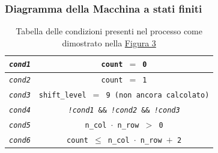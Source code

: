 \documentclass{article}
\begin{document}
\subsubsection{Diagramma della Macchina a stati finiti}
\begin{table}[h]
    \centering
    \caption{Tabella delle condizioni presenti nel processo come dimostrato nella \hyperref[fig:fsm]{Figura 3}}
    \begin{tabular}{||c|c||}
        \hline
        \texttt{\emph{cond1}} & \texttt{count $=$ 0} \\
        \hline
        \texttt{\emph{cond2}} & \texttt{count $=$ 1} \\
        \hline
        \texttt{\emph{cond3}} & \texttt{shift\_level $=$ 9 (non ancora calcolato)} \\
        \hline
        \texttt{\emph{cond4}} & \texttt{\emph{!cond1} \&\& \emph{!cond2} \&\& \emph{!cond3}} \\   
        \hline
        \texttt{\emph{cond5}} & \texttt{n\_col $\cdot$ n\_row $>$ 0} \\
        \hline
        \texttt{\emph{cond6}} & \texttt{count $\leq$ n\_col $\cdot$ n\_row $+$ 2} \\      
        \hline
        \end{tabular}
\end{table}
\pagebreak
\end{document}

